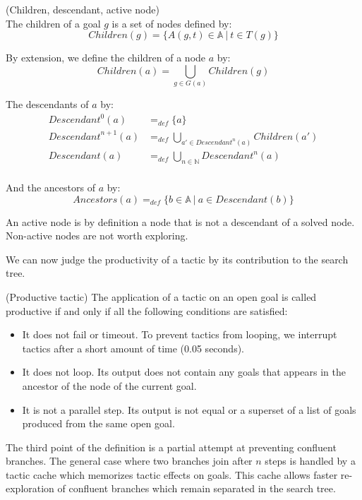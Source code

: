\documentclass[runningheads,a4paper,draft]{svjour3}
\begin{document}
\begin{definition}\label{def:desc}(Children, descendant, active node)\\
The children of a goal $g$ is a set of nodes defined by:
\[\mathit{Children}(g) = \lbrace A(g,t)\in \mathbb{A}\ |\ t \in T(g) \rbrace\]

By extension, we define the children of a node $a$ by:
\[\mathit{Children}(a) = \bigcup_{g \in G(a)} \mathit{Children}(g) \]

The descendants of $a$ by:
\begin{align*}
\mathit{Descendant}^{0}(a) &=_{def} \lbrace a \rbrace \\
\mathit{Descendant}^{n+1}(a) &=_{def} \bigcup_{a' \in \mathit{Descendant}^{n}(a)}
\mathit{Children}(a') \\
\mathit{Descendant}(a) &=_{def} \bigcup_{n \in \mathbb{N}} \mathit{Descendant}^n(a)\\
\end{align*}

And the ancestors of $a$ by:
\[\mathit{Ancestors}(a) =_{def} \lbrace b \in \mathbb{A} \ | \ a \in 
Descendant(b) \rbrace\]

An active node is by definition a node that is not a descendant of a
solved node. Non-active nodes are not worth exploring.
\end{definition}


We can now judge the productivity of a tactic by its contribution to the
search tree.

\begin{definition} (Productive tactic)
The application of a tactic on an open goal is called productive if and only if
all the following conditions are satisfied:
\begin{itemize}
\item It does not fail or timeout. To prevent tactics from looping, we
interrupt tactics after a short amount of time (0.05 seconds).
\item It does not loop. Its output does not contain any goals that appears in
the ancestor of the node of the current 
goal.
\item It is not a parallel step. Its output is not equal or a superset
of a list of goals produced from the same open goal.
\end{itemize}

The third point of the definition is a partial attempt at preventing confluent
branches. The general case where two branches join after $n$ steps is handled
by a tactic cache which memorizes tactic effects on goals. This
cache allows faster re-exploration of confluent branches which remain
separated in the search tree.
\end{definition}
\end{document}
